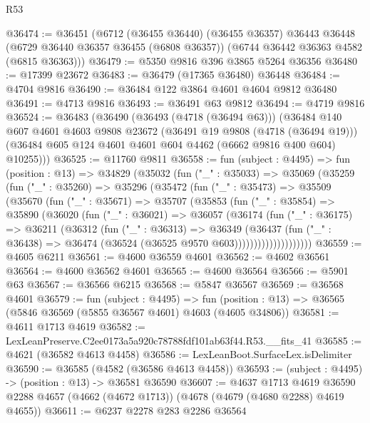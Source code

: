 \begin{lexlean}{R53}
\begin{coremodule}
@36474 := @36451
    (@6712
      (@36455 @36440)
      (@36455 @36357)
      @36443
      @36448
      (@6729 @36440 @36357 @36455 (@6808 @36357))
      (@6744 @36442 @36363 @4582 (@6815 @36363)))
@36479 := @5350 @9816 @396 @3865 @5264 @36356
@36480 := @17399 @23672
@36483 := @36479 (@17365 @36480) @36448
@36484 := @4704 @9816
@36490 := @36484 @122 @3864 @4601 @4604 @9812 @36480
@36491 := @4713 @9816
@36493 := @36491 @63 @9812
@36494 := @4719 @9816
@36524 := @36483
    (@36490
      (@36493 (@4718 (@36494 @63)))
      (@36484
        @140
        @607
        @4601
        @4603
        @9808
        @23672
        (@36491 @19 @9808 (@4718 (@36494 @19)))
        (@36484 @605 @124 @4601 @4601 @604 @4462 (@6662 @9816 @400 @604) @10255)))
@36525 := @11760 @9811
@36558 := fun (subject : @4495) =>
  fun (position : @13) =>
  @34829
    (@35032
      (fun ("_" : @35033) =>
      @35069
        (@35259
          (fun ("_" : @35260) =>
          @35296
            (@35472
              (fun ("_" : @35473) =>
              @35509
                (@35670
                  (fun ("_" : @35671) =>
                  @35707
                    (@35853
                      (fun ("_" : @35854) =>
                      @35890
                        (@36020
                          (fun ("_" : @36021) =>
                          @36057
                            (@36174
                              (fun ("_" : @36175) =>
                              @36211
                                (@36312
                                  (fun ("_" : @36313) =>
                                  @36349
                                    (@36437
                                      (fun ("_" : @36438) =>
                                      @36474 (@36524 (@36525 @9570 @603))))))))))))))))))))
@36559 := @4605 @6211
@36561 := @4600 @36559 @4601
@36562 := @4602 @36561
@36564 := @4600 @36562 @4601
@36565 := @4600 @36564
@36566 := @5901 @63
@36567 := @36566 @6215
@36568 := @5847 @36567
@36569 := @36568 @4601
@36579 := fun (subject : @4495) =>
  fun (position : @13) => @36565 (@5846 @36569 (@5855 @36567 @4601) @4603 (@4605 @34806))
@36581 := @4611 @1713 @4619
@36582 := LexLeanPreserve.C2ee0173a5a920c78788fdf101ab63f44.R53.__fits_41
@36585 := @4621 (@36582 @4613 @4458)
@36586 := LexLeanBoot.SurfaceLex.isDelimiter
@36590 := @36585 (@4582 (@36586 @4613 @4458))
@36593 := (subject : @4495) -> (position : @13) -> @36581 @36590
@36607 := @4637
    @1713
    @4619
    @36590
    @2288
    @4657
    (@4662 (@4672 @1713))
    (@4678 (@4679 (@4680 @2288) @4619 @4655))
@36611 := @6237 @2278 @283 @2286 @36564

\end{coremodule}
\end{lexlean}
